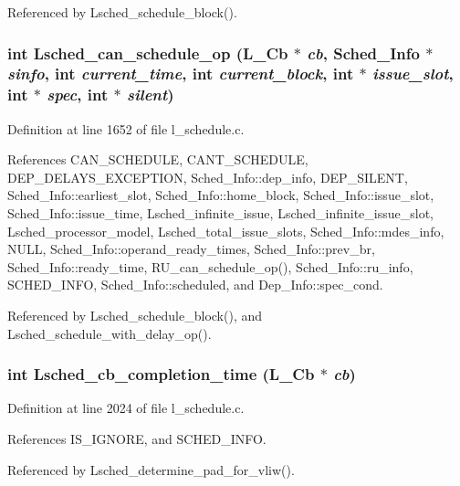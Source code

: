 Referenced by Lsched\_\-schedule\_\-block().
\subsubsection{\setlength{\rightskip}{0pt plus 5cm}int Lsched\_\-can\_\-schedule\_\-op (L\_\-Cb $\ast$ {\em cb}, \bf{Sched\_\-Info} $\ast$ {\em sinfo}, int {\em current\_\-time}, int {\em current\_\-block}, int $\ast$ {\em issue\_\-slot}, int $\ast$ {\em spec}, int $\ast$ {\em silent})}\label{l__schedule_8c_dffafbbbcd5e813ae2e9057db8a5853e}




Definition at line 1652 of file l\_\-schedule.c.

References CAN\_\-SCHEDULE, CANT\_\-SCHEDULE, DEP\_\-DELAYS\_\-EXCEPTION, Sched\_\-Info::dep\_\-info, DEP\_\-SILENT, Sched\_\-Info::earliest\_\-slot, Sched\_\-Info::home\_\-block, Sched\_\-Info::issue\_\-slot, Sched\_\-Info::issue\_\-time, Lsched\_\-infinite\_\-issue, Lsched\_\-infinite\_\-issue\_\-slot, Lsched\_\-processor\_\-model, Lsched\_\-total\_\-issue\_\-slots, Sched\_\-Info::mdes\_\-info, NULL, Sched\_\-Info::operand\_\-ready\_\-times, Sched\_\-Info::prev\_\-br, Sched\_\-Info::ready\_\-time, RU\_\-can\_\-schedule\_\-op(), Sched\_\-Info::ru\_\-info, SCHED\_\-INFO, Sched\_\-Info::scheduled, and Dep\_\-Info::spec\_\-cond.

Referenced by Lsched\_\-schedule\_\-block(), and Lsched\_\-schedule\_\-with\_\-delay\_\-op().
\subsubsection{\setlength{\rightskip}{0pt plus 5cm}int Lsched\_\-cb\_\-completion\_\-time (L\_\-Cb $\ast$ {\em cb})}\label{l__schedule_8c_ea239380278678733fcc0300478dca01}




Definition at line 2024 of file l\_\-schedule.c.

References IS\_\-IGNORE, and SCHED\_\-INFO.

Referenced by Lsched\_\-determine\_\-pad\_\-for\_\-vliw().
